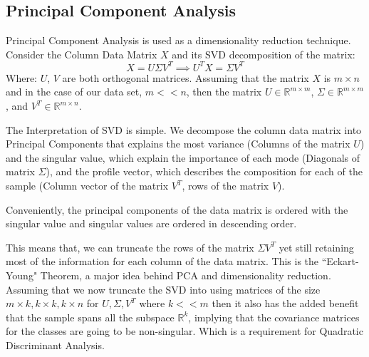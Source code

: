 \documentclass{article}
\begin{document}
    \subsection{Principal Component Analysis}
        \hspace{1.1em}
        Principal Component Analysis is used as a dimensionality reduction technique\cite{kutz_2013_387}. Consider the Column Data Matrix $X$ and its SVD decomposition of the matrix: 
        \begin{equation*}\tag{6}\label{eqn:6}
            X = U\Sigma V^T \implies U^TX = \Sigma V^T
        \end{equation*}
        Where: $U$, $V$ are both orthogonal matrices. Assuming that the matrix $X$ is $m\times n$ and in the case of our data set, $m << n$, then the matrix $U\in \mathbb{R}^{m\times m}$, $\Sigma \in\mathbb{R}^{m\times m}$, and $V^T\in\mathbb{R}^{m\times n}$. 
        \par
        The Interpretation of SVD is simple. We decompose the column data matrix into Principal Components that explains the most variance (Columns of the matrix $U$) and the singular value, which explain the importance of each mode (Diagonals of matrix $\Sigma$), and the profile vector, which describes the composition for each of the sample (Column vector of the matrix $V^T$, rows of the matrix $V$). 
        \par
        Conveniently, the principal components of the data matrix is ordered with the singular value and singular values are ordered in descending order. 
        \par
        This means that, we can truncate the rows of the matrix $\Sigma V^T$ yet still retaining most of the information for each column of the data matrix. This is the ``Eckart-Young" Theorem, a major idea behind PCA and dimensionality reduction. Assuming that we now truncate the SVD into using matrices of the size $m \times k, k\times k, k\times n$ for $U, \Sigma, V^T$ where $k << m$ then it also has the added benefit that the sample spans all the subspace $\mathbb{R}^k$, implying that the covariance matrices for the classes are going to be non-singular. Which is a requirement for Quadratic Discriminant Analysis. 
        
\end{document}

